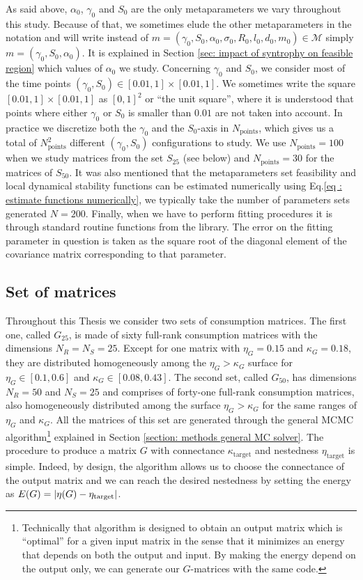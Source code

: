 \documentclass[12pt]{report}
\begin{document}
As said above, $\alpha_0$, $\gamma_0$ and $S_0$ are the only metaparameters we vary throughout this study. Because of that, we sometimes elude the other metaparameters in the notation and will write instead of $m=(\gamma_0, S_0, \alpha_0, \sigma_0, R_0, l_0, d_0, m_0) \in \mathcal{M}$ simply $m=(\gamma_0, S_0, \alpha_0)$. It is explained in Section \ref{sec: impact of syntrophy on feasible region} which values of $\alpha_0$ we study. Concerning $\gamma_0$ and $S_0$, we consider most of the time points $(\gamma_0, S_0) \in [0.01, 1]\times[0.01, 1]$. We sometimes write the square $[0.01, 1]\times[0.01, 1]$ as $[0,1]^2$ or ``the unit square'', where it is understood that points where either $\gamma_0$ or $S_0$ is smaller than $0.01$ are not taken into account. In practice we discretize both the $\gamma_0$ and the $S_0$-axis in $N_{\text{points}}$, which gives us a total of $N_{\text{points}}^2$ different $(\gamma_0, S_0)$ configurations to study. We use $N_{\text{points}}=100$ when we study matrices from the set $S_{25}$ (see below) and $N_\text{points}=30$ for the matrices of $S_{50}$. It was also mentioned that the metaparameters set feasibility and local dynamical stability functions can be estimated numerically using Eq.\eqref{eq : estimate functions numerically}, we typically take the number of parameters sets generated $N=200$. Finally, when we have to perform fitting procedures it is through standard routine functions from the   library. The error on the fitting parameter in question is taken as the square root of the diagonal element of the covariance matrix corresponding to that parameter.

\subsection{Set of matrices}\label{sec : set of matrices}
Throughout this Thesis we consider two sets of consumption matrices. The first one, called $G_{25}$, is made of sixty full-rank consumption matrices with the dimensions $N_R=N_S=25$. Except for one matrix with $\eta_G=0.15$ and $\kappa_G=0.18$, they are  distributed homogeneously among the $\eta_G>\kappa_G$ surface for $\eta_G \in [0.1, 0.6]$ and $\kappa_G \in [0.08, 0.43]$. The second set, called $G_{50}$, has dimensions $N_R=50$ and $N_S=25$ and comprises of forty-one full-rank consumption matrices, also homogeneously distributed among the surface $\eta_G>\kappa_G$ for the same ranges of $\eta_G$ and $\kappa_G$. All the matrices of this set are generated through the general MCMC algorithm\footnote{Technically that algorithm is designed to obtain an output matrix which is ``optimal'' for a given input matrix in the sense that it minimizes an energy that depends on both the output and input. By making the energy depend on the output only, we can generate our $G$-matrices with the same code.} explained in Section \ref{section: methods general MC solver}. The procedure to produce a matrix $G$ with connectance $\kappa_{\text{target}}$ and nestedness $\eta_{\text{target}}$ is simple. Indeed, by design, the algorithm allows us to choose the connectance of the output matrix and we can reach the desired nestedness by setting the energy as $E(G)=\left|{\eta(G)-\eta_{\text{target}}}\right|$.
\end{document}
